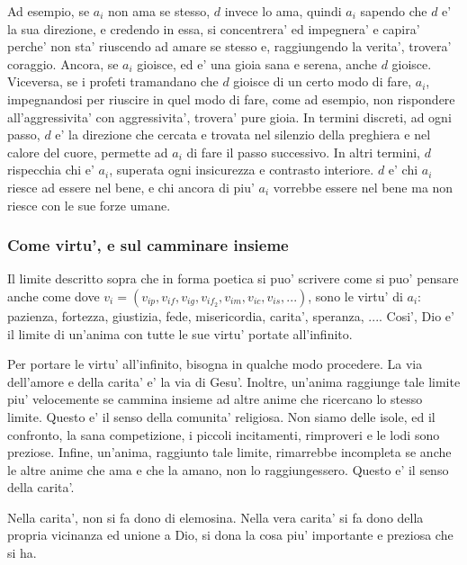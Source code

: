 Ad esempio, se $a_i$ non ama se stesso, $d$ invece lo ama, quindi $a_i$ sapendo che $d$ e' la sua direzione, e credendo in essa, si concentrera' ed impegnera' e capira' perche' non sta' riuscendo ad amare se stesso e, raggiungendo la verita', trovera' coraggio. Ancora, se $a_i$ gioisce, ed e' una gioia sana e serena, anche $d$ gioisce. Viceversa, se i profeti tramandano che $d$ gioisce di un certo modo di fare, $a_i$, impegnandosi per riuscire in quel modo di fare, come ad esempio, non rispondere all'aggressivita' con aggressivita', trovera' pure gioia. In termini discreti, ad ogni passo, $d$ e' la direzione che cercata e trovata nel silenzio della preghiera e nel calore del cuore, permette ad $a_i$ di fare il passo successivo. In altri termini, $d$ rispecchia chi e' $a_i$, superata ogni insicurezza e contrasto interiore. $d$ e' chi $a_i$ riesce ad essere nel bene, e chi ancora di piu' $a_i$ vorrebbe essere nel bene ma non riesce con le sue forze umane.

\subsubsection{Come virtu', e sul camminare insieme}
Il limite descritto sopra
che in forma poetica si puo' scrivere come
si puo' pensare anche come 
dove $v_i=(v_{ip},v_{if},v_{ig},v_{if_2},v_{im},v_{ic},v_{is},...)$, sono le virtu' di $a_i$: pazienza, fortezza, giustizia, fede, misericordia, carita', speranza, .... Cosi', Dio e' il limite di un'anima con tutte le sue virtu' portate all'infinito.

Per portare le virtu' all'infinito, bisogna in qualche modo procedere. La via dell'amore e della carita' e' la via di Gesu'. Inoltre, un'anima raggiunge tale limite piu' velocemente se cammina insieme ad altre anime che ricercano lo stesso limite. Questo e' il senso della comunita' religiosa. Non siamo delle isole, ed il confronto, la sana competizione, i piccoli incitamenti, rimproveri e le lodi sono preziose. Infine, un'anima, raggiunto tale limite, rimarrebbe incompleta se anche le altre anime che ama e che la amano, non lo raggiungessero. Questo e' il senso della carita'.

Nella carita', non si fa dono di elemosina. Nella vera carita' si fa dono della propria vicinanza ed unione a Dio, si dona la cosa piu' importante e preziosa che si ha.



